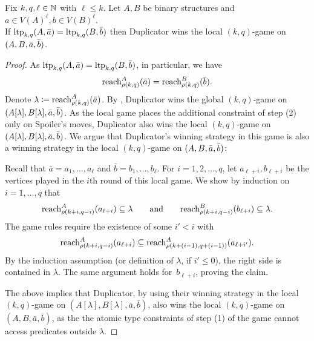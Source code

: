 \begin{lemma}\label{lem:localtype}Fix $k,q,\ell\in\mathbb N$ with $\ell\le k$.
Let \(A,B\) be binary structures and \(a \in V(A)^\ell, b \in V(B)^\ell\).\\
If \(\textnormal{ltp}_{k,q}(A,\bar a) = \textnormal{ltp}_{k,q}(B,\bar b)\) then Duplicator wins the local \((k,q)\)-game on \((A,B,\bar a,\bar b)\).
\end{lemma}
\begin{proof}
    As $\textnormal{ltp}_{k,q}(A,\bar a) = \textnormal{ltp}_{k,q}(B,\bar b)$, in particular, we have $${\rm reach}^A_{\rho(k,q)}(\bar a)= {\rm reach}^B_{\rho(k,q)}(\bar b).$$
    Denote  $\lambda\coloneqq {\rm reach}^A_{\rho(k,q)}(\bar a)$.
    By , Duplicator wins the global \((k,q)\)-game on \((A[\lambda],B[\lambda],\\\bar a,\bar b)\).
    As the local game places the additional constraint of step (2) only on Spoiler's moves,
    Duplicator also wins the local \((k,q)\)-game on \((A[\lambda],B[\lambda],\bar a, \bar b)\).
    We argue that  Duplicator's winning strategy in this game is also a winning strategy in the local $(k,q)$-game on $(A,B,\bar a,\bar b)$:

    Recall that \(\bar a = a_1,\dots,a_\ell\) and \(\bar b = b_1,\dots,b_\ell\).
    For $i=1,2,\ldots,q$,
    let \(a_{\ell+i},b_{\ell+i}\) be the vertices played in the \(i\)th round of this local game.
    We show by induction on \(i=1,\ldots,q\) that
    \[
        {\rm reach}^A_{\rho(k+i,q-i)}(a_{\ell+i}) \subseteq \lambda
    \qquad\text{and}\qquad
        {\rm reach}^B_{\rho(k+i,q-i)}(b_{\ell+i}) \subseteq \lambda.
    \]
    The game rules require the existence of some \(i' < i\) with
    \[
        {\rm reach}^A_{\rho(k+i,q-i)}(a_{\ell+i}) \subseteq {\rm reach}^A_{\rho(k+(i-1),q+(i-1))}(a_{\ell+i'}).
    \]
    By the induction assumption (or definition of $\lambda$, if $i' \le 0$), the right side is contained in $\lambda$.
    The same argument holds for~\(b_{\ell+i}\),  proving the claim.
    
    The above implies that Duplicator, by using their winning strategy in the local $(k,q)$-game on \((A[\lambda],B[\lambda],\bar a, \bar b)\), also wins the local $(k,q)$-game on $(A,B,\bar a,\bar b)$, as the 
    the atomic type constraints of step (1) of the game cannot access predicates outside \(\lambda\).
\end{proof}


